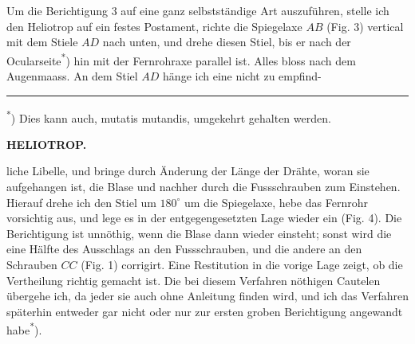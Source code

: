 \par\noindent\hspace*{\parindent}Um die Berichtigung 3 auf eine ganz selbstständige Art auszuführen, stelle ich den Heliotrop auf ein festes Postament, richte die Spiegelaxe $AB$ (Fig. 3) vertical mit dem Stiele $AD$ nach unten, und drehe diesen Stiel, bis er nach der Ocularseite\textsuperscript{*}) hin mit der Fernrohraxe parallel ist. Alles bloss nach dem Augenmaass. An dem Stiel $AD$ hänge ich eine nicht zu empfind-
\par\medskip\noindent\rule{4cm}{.4pt}\par
\begingroup\footnotesize\noindent\hspace*{\parindent}\textsuperscript{*}) Dies kann auch, mutatis mutandis, umgekehrt gehalten werden.\par\endgroup

\par\clearpage
\noindent\null\hfill{\small\textbf{HELIOTROP.}}\hfill{}\par\medskip
\noindent liche Libelle, und bringe durch Änderung der Länge der Drähte, woran sie aufgehangen ist, die Blase  und nachher durch die Fussschrauben  zum Einstehen. Hierauf drehe ich den Stiel um $180^\circ$ um die Spiegelaxe, hebe das Fernrohr vorsichtig aus, und lege es in der entgegengesetzten Lage wieder ein (Fig. 4). Die Berichtigung ist unnöthig, wenn die Blase dann wieder einsteht; sonst wird die eine Hälfte des Ausschlags an den Fussschrauben, und die andere an den Schrauben $CC$ (Fig. 1) corrigirt. Eine Restitution in die vorige Lage zeigt, ob die Vertheilung richtig gemacht ist. Die bei diesem Verfahren nöthigen Cautelen übergehe ich, da jeder sie auch ohne Anleitung finden wird, und ich das Verfahren späterhin entweder gar nicht oder nur zur ersten groben Berichtigung angewandt habe\textsuperscript{*}).

